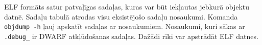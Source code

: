 ELF formāts satur patvaļīgas sadaļas, kuras var būt iekļautas jebkurā objektu datnē. Sadaļu tabulā atrodas visu eksistējošo sadaļu nosaukumi.
Komanda \texttt{objdump -h} ļauj apskatīt sadaļas ar nosaukumiem. Nosaukumi, kuri sākas ar \texttt{.debug\_} ir DWARF atkļūdošanas sadaļas.
Dažādi rīki var apstrādāt ELF datnes.



